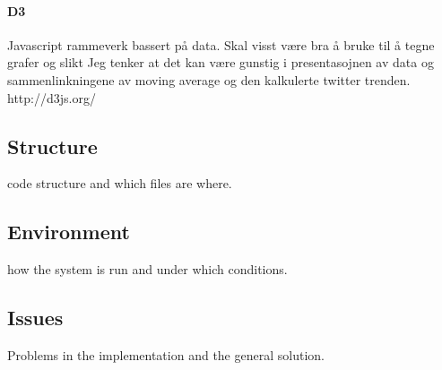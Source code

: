 \paragraph{D3}
Javascript rammeverk bassert på data. 
Skal visst være bra å bruke til å tegne grafer og slikt
Jeg tenker at det kan være gunstig i presentasojnen av data og sammenlinkningene
av moving average og den kalkulerte twitter trenden. 
http://d3js.org/

\subsection{Structure}
code structure and which files are where. 
\subsection{Environment}
how the system is run and under which conditions.
\subsection{Issues}
Problems in the implementation and the general solution. 



